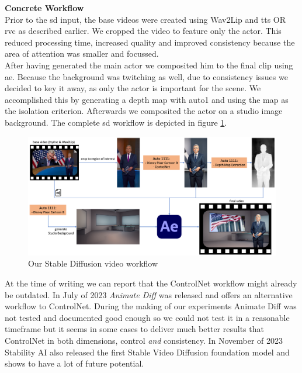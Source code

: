 \documentclass[
  a4paper,  %
  twoside,  %
  bibliography=totoc,
  headsepline,
  cleardoublepage=empty,
  parskip=half,
  draft=false
]{scrbook}
\begin{document}
\textbf{Concrete Workflow} \\
Prior to the \gls{sd} input, the base videos were created using Wav2Lip and \gls{tts} OR \gls{rvc} as described earlier. We cropped the video to feature only the actor. This reduced processing time, increased quality and improved consistency because the area of attention was smaller and focussed. \\
After having generated the main actor we composited him to the final clip using \gls{ae}. Because the background was  twitching as well, due to consistency issues we decided to key it away, as only the actor is important for the scene. We accomplished this by generating a depth map with \gls{auto1} and using the map as the isolation criterion. Afterwards we composited the actor on a studio image background. The complete \gls{sd} workflow is depicted in figure \ref{fig:sd-full-workflow}. 

\begin{figure}[h]
  \centering
  \includegraphics[width=1\textwidth]{./graphics/images/diffusion/sd-workflow.png}
  \caption{Our Stable Diffusion video workflow}
  \label{fig:sd-full-workflow}
\end{figure}

At the time of writing we can report that the ControlNet workflow might already be outdated. In July of 2023 \textit{Animate Diff} was released and offers an alternative workflow to ControlNet. During the making of our experiments Animate Diff was not tested and documented good enough so we could not test it in a reasonable timeframe but it seems in some cases to deliver much better results that ControlNet in both dimensions, control \textit{and} consistency. In November of 2023 Stability AI also released the first Stable Video Diffusion foundation model and shows to have a lot of future potential. 
\end{document}
